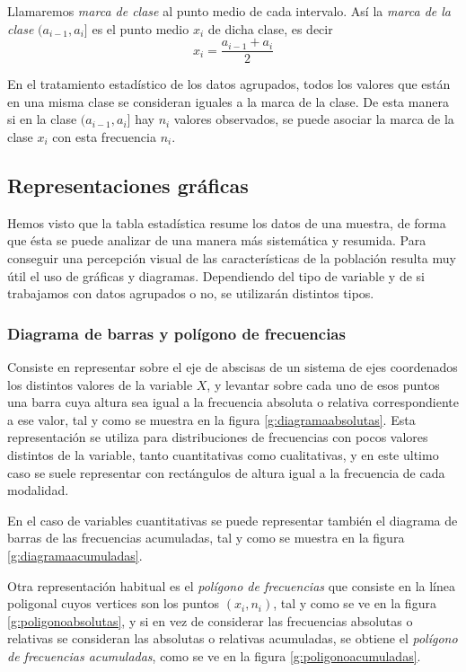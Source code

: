 Llamaremos \emph{marca de clase} al punto medio de cada intervalo. 
Así la \emph{marca de la clase} $(a_{i-1},a_i]$ es el punto medio
$x_i$ de dicha clase, es decir
\[ x_i=\frac{a_{i-1}+a_i}{2} \]

En el tratamiento estadístico de los datos agrupados, todos los valores que están en una misma clase se consideran
iguales a la marca de la clase.
De esta manera si en la clase $(a_{i-1},a_i]$ hay $n_i$ valores observados, se puede asociar la marca de la clase $x_i$ con esta frecuencia $n_i$.


\subsection{Representaciones gráficas}

Hemos visto que la tabla estadística resume los datos de una muestra, de forma que ésta se puede analizar de una manera más sistemática y resumida.
Para conseguir una percepción visual de las características de la población resulta muy útil el uso de gráficas y diagramas. Dependiendo del tipo de variable y de si trabajamos con datos agrupados o no, se utilizarán distintos tipos.


\subsubsection{Diagrama de barras y polígono de frecuencias}

Consiste en representar sobre el eje de abscisas de un sistema de ejes coordenados los distintos valores de la variable $X$, y levantar sobre cada uno de esos puntos una barra cuya altura sea igual a la frecuencia absoluta o relativa correspondiente a ese valor, tal y como se muestra en la figura \ref{g:diagramaabsolutas}.
Esta representación se utiliza para distribuciones de frecuencias con pocos valores distintos de la variable, tanto cuantitativas como cualitativas, y en este ultimo caso se suele representar con rectángulos de altura igual a la frecuencia de cada modalidad.

En el caso de variables cuantitativas se puede representar también el diagrama de barras de las frecuencias acumuladas, tal y como se muestra en la figura \ref{g:diagramaacumuladas}.

Otra representación habitual es el \emph{polígono de frecuencias} que consiste en la línea poligonal cuyos vertices son los puntos $(x_i,n_i)$, tal y como se ve en la figura \ref{g:poligonoabsolutas}, y si en vez de considerar las frecuencias absolutas o relativas se consideran las absolutas o relativas acumuladas, se obtiene el \emph{polígono de frecuencias acumuladas}, como se ve en la figura \ref{g:poligonoacumuladas}.

